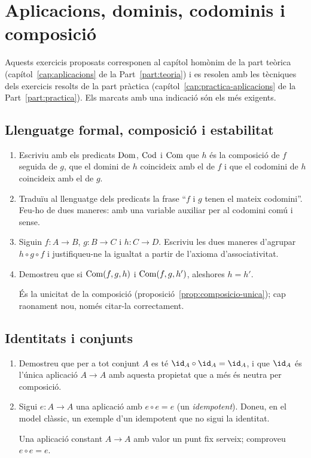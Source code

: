 \chapter{Aplicacions, dominis, codominis i composició}\label{cap:exercicis-aplicacions}

Aquests exercicis proposats corresponen al capítol homònim de la part teòrica (capítol~\ref{cap:aplicacions} de la Part~\ref{part:teoria}) i es resolen amb les tècniques dels exercicis resolts de la part pràctica (capítol~\ref{cap:practica-aplicacions} de la Part~\ref{part:practica}). Els marcats amb una indicació són els més exigents.

\section{Llenguatge formal, composició i estabilitat}

\begin{enumerate}
  \item Escriviu amb els predicats \(\operatorname{Dom}\), \(\operatorname{Cod}\) i \(\operatorname{Com}\) que \(h\) és la composició de \(f\) seguida de \(g\), que el domini de \(h\) coincideix amb el de \(f\) i que el codomini de \(h\) coincideix amb el de \(g\).

  \item Traduïu al llenguatge dels predicats la frase \enquote{\(f\) i \(g\) tenen el mateix codomini}. Feu-ho de dues maneres: amb una variable auxiliar per al codomini comú i sense.

  \item Siguin \(f\colon A\to B\), \(g\colon B\to C\) i \(h\colon C\to D\). Escriviu les dues maneres d'agrupar \(h\circ g\circ f\) i justifiqueu-ne la igualtat a partir de l'axioma d'associativitat.

  \item Demostreu que si \(\operatorname{Com}(f,g,h)\) i \(\operatorname{Com}(f,g,h')\), aleshores \(h=h'\). \begin{indicacio}És la unicitat de la composició (proposició~\ref{prop:composicio-unica}); cap raonament nou, només citar-la correctament.\end{indicacio}
\end{enumerate}

\section{Identitats i conjunts}

\begin{enumerate}[resume]
  \item Demostreu que per a tot conjunt \(A\) es té \(\id_A\circ\id_A=\id_A\), i que \(\id_A\) és l'única aplicació \(A\to A\) amb aquesta propietat que a més és neutra per composició.

  \item Sigui \(e\colon A\to A\) una aplicació amb \(e\circ e=e\) (un \emph{idempotent}). Doneu, en el model clàssic, un exemple d'un idempotent que no sigui la identitat. \begin{indicacio}Una aplicació constant \(A\to A\) amb valor un punt fix serveix; comproveu \(e\circ e=e\).\end{indicacio}
\end{enumerate}

